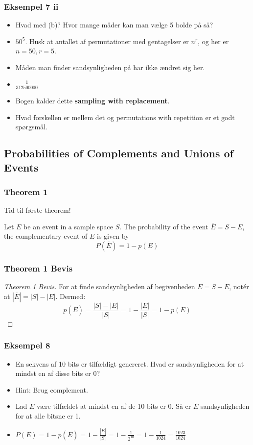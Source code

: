 \documentclass{beamer}
\begin{document}
\begin{frame}
  \frametitle{Eksempel 7 ii}
 \begin{itemize}
 \item<1-> Hvad med (b)? Hvor mange måder kan man vælge 5 bolde på så?
 \item<2-> $50^5$. Husk at antallet af permutationer med gentagelser er $n^r$, og her er $n = 50, r = 5$.
 \item<3-> Måden man finder sandsynligheden på har ikke ændret sig her.
 \item<3-> $\frac{1}{312500000}$
 \item<3-> Bogen kalder dette \textbf{sampling with replacement}.
   \item<3-> Hvad forskellen er mellem det og permutations with repetition er et godt spørgsmål.
 \end{itemize} 
\end{frame}

\subsection{Probabilities of Complements and Unions of Events}
\label{subsec:probcompunion}

\begin{frame}
  \frametitle{Theorem 1}
  Tid til første theorem!
  \begin{theorem}[Theorem 1]
    Let $E$ be an event in a sample space $S$. The probability of the event $\overline{E} = S - E$, the complementary event of $E$ is given by $$P(\overline{E}) = 1 - p(E)$$
  \end{theorem}
\end{frame}

\begin{frame}
  \frametitle{Theorem 1 Bevis}
  \begin{proof}[Theorem 1 Bevis]
For at finde sandsynligheden af begivenheden $\overline{E} = S - E$, notér at $|\overline{E}| = |S| - |E|$. Dermed: $$p(\overline{E}) = \frac{|S|-|E|}{|S|}=1 - \frac{|E|}{|S|}=1-p(E)$$
  \end{proof}
\end{frame}

\begin{frame}
  \frametitle{Eksempel 8}
  \begin{itemize}
  \item<1-> En sekvens af 10 bits er tilfældigt genereret. Hvad er sandsynligheden for at mindst en af disse bits er 0?
  \item<1-> Hint: Brug complement.
  \item<2-> Lad $E$ være tilfældet at mindst en af de 10 bits er 0. Så er $\overline{E}$ sandsynligheden for at alle bitsne er 1. 
  \item<3-> $P(E) = 1-p(\overline{E})=1- \frac{|\overline{E}|}{|S|}=1- \frac{1}{2^{10}} = 1 - \frac{1}{1024} = \frac{1023}{1024}$
  \end{itemize}
\end{frame}
\end{document}
